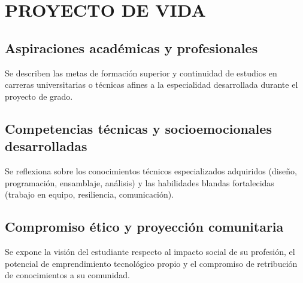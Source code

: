 \chapter{PROYECTO DE VIDA}
\label{chap:proyecto_vida}

\section{Aspiraciones académicas y profesionales}
\label{sec:aspiraciones_academicas}
Se describen las metas de formación superior y continuidad de estudios en carreras universitarias o técnicas afines a la especialidad desarrollada durante el proyecto de grado.

\section{Competencias técnicas y socioemocionales desarrolladas}
\label{sec:competencias_desarrolladas}
Se reflexiona sobre los conocimientos técnicos especializados adquiridos (diseño, programación, ensamblaje, análisis) y las habilidades blandas fortalecidas (trabajo en equipo, resiliencia, comunicación).

\section{Compromiso ético y proyección comunitaria}
\label{sec:compromiso_comunitario}
Se expone la visión del estudiante respecto al impacto social de su profesión, el potencial de emprendimiento tecnológico propio y el compromiso de retribución de conocimientos a su comunidad.

